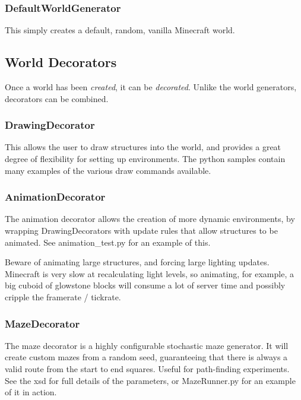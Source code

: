 \documentclass[11pt]{article} %
\begin{document}
\subsubsection{DefaultWorldGenerator}

This simply creates a default, random, vanilla Minecraft world.

\subsection{World Decorators}

Once a world has been \emph{created}, it can be \emph{decorated}. Unlike the world generators, decorators can be combined.

\subsubsection{DrawingDecorator}
This allows the user to draw structures into the world, and provides a great degree of flexibility for setting up environments. The python samples contain many examples of the various draw commands available.

\subsubsection{AnimationDecorator}
The animation decorator allows the creation of more dynamic environments, by wrapping DrawingDecorators with update rules that allow structures to be animated. See animation\_test.py for an example of this.

\begin{mdframed}[style=tipFrame]
Beware of animating large structures, and forcing large lighting updates. Minecraft is very slow at recalculating light levels, so animating, for example, a big cuboid of glowstone blocks will consume a lot of server time and possibly cripple the framerate / tickrate.
\end{mdframed}

\subsubsection{MazeDecorator}
The maze decorator is a highly configurable stochastic maze generator. It will create custom mazes from a random seed, guaranteeing that there is always a valid route from the start to end squares. Useful for path-finding experiments. See the xsd for full details of the parameters, or MazeRunner.py for an example of it in action.
\end{document}

